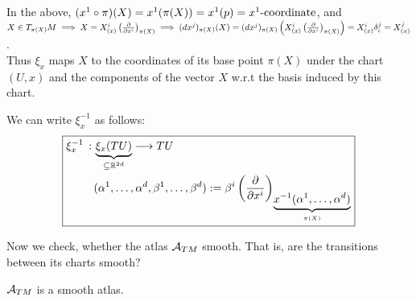 In the above, $(x^1 \circ \pi)(X) = x^1(\pi(X)) = x^1(p) = x^1 \text{-coordinate}$, and \\
$X \in T_{\pi(X)}M \implies X = X_{(x)}^i \left(\frac{\partial }{\partial x^i}\right)_{\pi(X)} \implies (dx^j)_{\pi(X)}(X) = (dx^j)_{\pi(X)} \left(X^i_{(x)}\left(\frac{\partial }{\partial x^i}\right)_{\pi(X)} \right) = X^i_{(x)}\delta_i^j = X^j_{(x)}$. \\
Thus $\xi_x$ maps $X$ to the coordinates of its base point $\pi(X)$ under the chart $(U,x)$ and the components of the vector $X$ w.r.t the basis induced by this chart.

We can write $\xi_x^{-1}$ as follows:
\begin{equation}\label{eq:xiInverseTangentBundle}
\boxed{
\begin{split}
\xi_x^{-1} \, : \, & \underbrace{\xi_x(TU)}_{\subseteq \mathbb{R}^{2d}} \longrightarrow TU \\
& (\alpha^1, \dotsc, \alpha^d, \beta^1, \dotsc, \beta^d) := \beta^i \left(\frac{\partial }{\partial x^i}\right)_{\underbrace{x^{-1}(\alpha^1, \dotsc, \alpha^d)}_{\pi(X)}}
\end{split}
}
\end{equation}

Now we check, whether the atlas $\mathcal{A}_{TM}$ smooth. That is, are the transitions between its charts smooth?

\begin{theorem}
$\mathcal{A}_{TM}$ is a smooth atlas.
\end{theorem}


